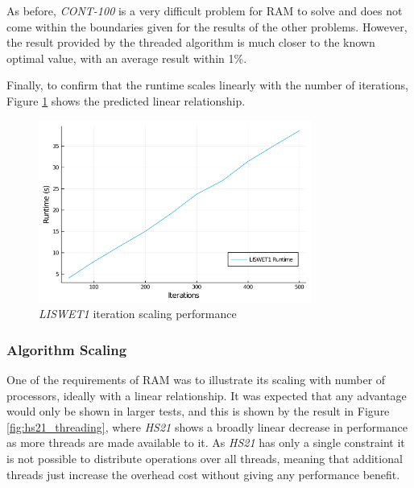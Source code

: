 As before, \textit{CONT-100} is a very difficult problem for RAM to solve and does not come within the boundaries given for the results of the other problems. However, the result provided by the threaded algorithm is much closer to the known optimal value, with an average result within 1\%.

Finally, to confirm that the runtime scales linearly with the number of iterations, Figure \ref{fig:liswet1_iteration} shows the predicted linear relationship.

\begin{figure}[tb]
    \centering
    \includegraphics[width=0.8\textwidth]{Plots/LISWET1_iteration_runtime.png}
    \caption{\textit{LISWET1} iteration scaling performance}
    \label{fig:liswet1_iteration}
\end{figure}

\subsubsection{Algorithm Scaling}

One of the requirements of RAM was to illustrate its scaling with number of processors, ideally with a linear relationship. It was expected that any advantage would only be shown in larger tests, and this is shown by the result in Figure \ref{fig:hs21_threading}, where \textit{HS21} shows a broadly linear decrease in performance as more threads are made available to it. As \textit{HS21} has only a single constraint it is not possible to distribute operations over all threads, meaning that additional threads just increase the overhead cost without giving any performance benefit. 

